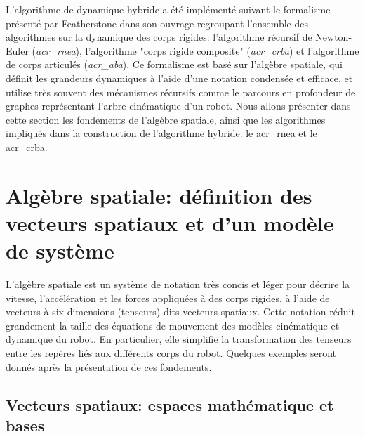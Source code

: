 \documentclass{report}
\begin{document}

L'algorithme de dynamique hybride a été implémenté suivant le formalisme présenté par Featherstone dans son ouvrage \cite{Featherstone} regroupant l'ensemble des algorithmes sur la dynamique des corps rigides: l'algorithme récursif de Newton-Euler (\emph{\gls{acr_rnea}}), l'algorithme "corps rigide composite" (\emph{\gls{acr_crba}}) et l'algorithme de corps articulés (\emph{\gls{acr_aba}}). Ce formalisme est basé sur l'algèbre spatiale, qui définit les grandeurs dynamiques à l'aide d'une notation condensée et efficace, et utilise très souvent des mécanismes récursifs comme le parcours en profondeur de graphes représentant l'arbre cinématique d'un robot. Nous allons présenter dans cette section les fondements de l'algèbre spatiale, ainsi que les algorithmes impliqués dans la construction de l'algorithme hybride: le \gls{acr_rnea} et le \gls{acr_crba}.\\


\section{Algèbre spatiale: définition des vecteurs spatiaux et d'un modèle de système}

L'algèbre spatiale est un système de notation très concis et léger pour décrire la vitesse, l'accélération et les forces appliquées à des corps rigides, à l'aide de vecteurs à six dimensions (tenseurs) dits vecteurs spatiaux. Cette notation réduit grandement la taille des équations de mouvement des modèles cinématique et dynamique du robot. En particulier, elle simplifie la transformation des tenseurs entre les repères liés aux différents corps du robot. Quelques exemples seront donnés après la présentation de ces fondements.\\


\subsection{Vecteurs spatiaux: espaces mathématique et bases}
\end{document}
